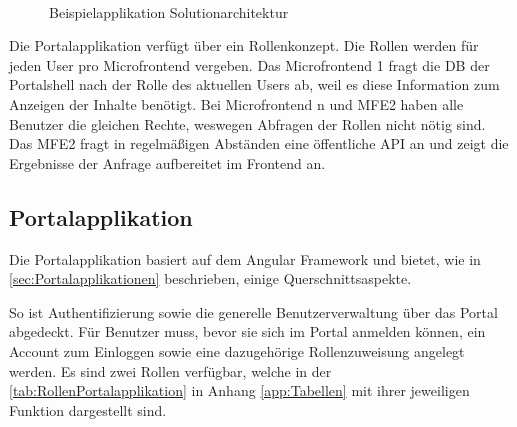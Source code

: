 \newpage
\begin{figure}[hbt]
	\centering
	\begin{minipage}[t]{0.6\textwidth}	
		\caption{Beispielapplikation Solutionarchitektur}
		\\ %
		\label{fig:SolutionarchitekturBsp}
	\end{minipage}
\end{figure}

Die Portalapplikation verfügt über ein Rollenkonzept. Die Rollen werden für jeden User pro Microfrontend vergeben. Das Microfrontend 1 fragt die \gls{DB} der Portalshell nach der Rolle des aktuellen Users ab, weil es diese Information zum Anzeigen der Inhalte benötigt. Bei Microfrontend n und \gls{MFE2} haben alle Benutzer die gleichen Rechte, weswegen Abfragen der Rollen nicht nötig sind. Das \gls{MFE2} fragt in regelmäßigen Abständen eine öffentliche \gls{API} an und zeigt die Ergebnisse der Anfrage aufbereitet im Frontend an.

\subsection{Portalapplikation}\label{sec:PrototypPortalapplikation}

Die Portalapplikation basiert auf dem Angular Framework und bietet, wie in \cref{sec:Portalapplikationen} beschrieben, einige Querschnittsaspekte.

So ist Authentifizierung sowie die generelle Benutzerverwaltung über das Portal abgedeckt. Für Benutzer muss, bevor sie sich im Portal anmelden können, ein Account zum Einloggen sowie eine dazugehörige Rollenzuweisung angelegt werden. Es sind zwei Rollen verfügbar, welche in der \cref{tab:RollenPortalapplikation} in Anhang \ref{app:Tabellen} mit ihrer jeweiligen Funktion dargestellt sind.

